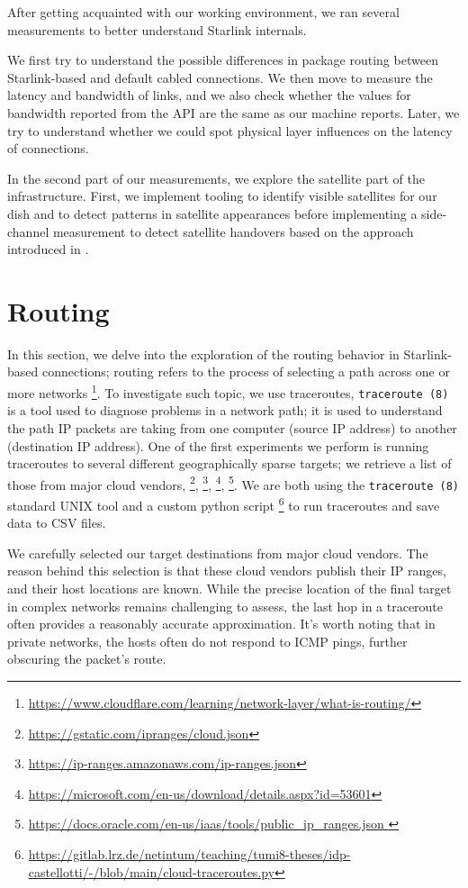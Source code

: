 \documentclass[IN,11pt,twoside,openright,idp,english]{tumthesis}
\begin{document}
After getting acquainted with our working environment, we ran several measurements to better understand Starlink internals. 
    
We first try to understand the possible differences in package routing between Starlink-based and default cabled connections. We then move to measure the latency and bandwidth of links, and we also check whether the values for bandwidth reported from the API are the same as our machine reports. Later, we try to understand whether we could spot physical layer influences on the latency of connections.  
    
In the second part of our measurements, we explore the satellite part of the infrastructure. First, we implement tooling to identify visible satellites for our dish and to detect patterns in satellite appearances before implementing a side-channel measurement to detect satellite handovers based on the approach introduced in \cite{izhikevich2023democratizing}.
    
\section{Routing}
    
In this section, we delve into the exploration of the routing behavior in Starlink-based connections; routing refers to the process of selecting a path across one or more networks \footnote{\url{https://www.cloudflare.com/learning/network-layer/what-is-routing/}}. To investigate such topic, we use traceroutes, \texttt{traceroute (8)}  is a tool used to diagnose problems in a network path; it is used to understand the path IP packets are taking from one computer (source IP address) to another (destination IP address). One of the first experiments we perform is running traceroutes to several different geographically sparse targets; we retrieve a list of those from major cloud vendors, \footnote{\url{ https://gstatic.com/ipranges/cloud.json}}, \footnote{\url{https://ip-ranges.amazonaws.com/ip-ranges.json}}, \footnote{\url{https://microsoft.com/en-us/download/details.aspx?id=53601}}, \footnote{\url{https://docs.oracle.com/en-us/iaas/tools/public_ip_ranges.json }}. We are both using the \texttt{traceroute (8)} standard UNIX tool and a custom python script \footnote{\url{https://gitlab.lrz.de/netintum/teaching/tumi8-theses/idp-castellotti/-/blob/main/cloud-traceroutes.py}} to run traceroutes and save data to CSV files.
    
We carefully selected our target destinations from major cloud vendors. The reason behind this selection is that these cloud vendors publish their IP ranges, and their host locations are known. While the precise location of the final target in complex networks remains challenging to assess, the last hop in a traceroute often provides a reasonably accurate approximation. It's worth noting that in private networks, the hosts often do not respond to ICMP pings, further obscuring the packet's route.
\end{document}
